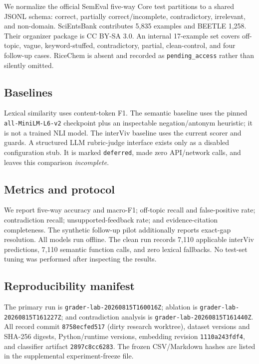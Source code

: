 \documentclass[conference,a4paper]{IEEEtran}
\begin{document}
We normalize the official SemEval five-way Core test partitions to a shared
JSONL schema: correct, partially correct/incomplete, contradictory, irrelevant,
and non-domain. SciEntsBank contributes 5,835 examples and BEETLE 1,258. Their
organizer package is CC BY-SA 3.0. An internal 17-example set covers off-topic,
vague, keyword-stuffed, contradictory, partial, clean-control, and four
follow-up cases. RiceChem is absent and recorded as
\texttt{pending\_access} rather than silently omitted.

\subsection{Baselines}

Lexical similarity uses content-token F1. The semantic baseline uses the pinned
\texttt{all-MiniLM-L6-v2} checkpoint plus an inspectable negation/antonym
heuristic; it is not a trained NLI model. The interViv baseline uses the current
scorer and guards. A structured LLM rubric-judge interface exists only as a
disabled configuration stub. It is marked \texttt{deferred}, made zero
API/network calls, and leaves this comparison \emph{incomplete}.

\subsection{Metrics and protocol}

We report five-way accuracy and macro-F1; off-topic recall and false-positive
rate; contradiction recall; unsupported-feedback rate; and evidence-citation
completeness. The synthetic follow-up pilot additionally reports exact-gap
resolution. All models run offline. The clean run records 7,110 applicable
interViv predictions, 7,110 semantic function calls, and zero lexical
fallbacks. No test-set tuning was performed after inspecting the results.

\subsection{Reproducibility manifest}

The primary run is \texttt{grader-lab-20260815T160016Z}; ablation is
\texttt{grader-lab-20260815T161227Z}; and contradiction analysis is
\texttt{grader-lab-20260815T161440Z}. All record commit
\texttt{8758ecfed517} (dirty research worktree), dataset versions and SHA-256
digests, Python/runtime versions, embedding revision \texttt{1110a243fdf4},
and classifier artifact \texttt{2897c8cc6283}. The frozen CSV/Markdown hashes
are listed in the supplemental experiment-freeze file.
\end{document}
